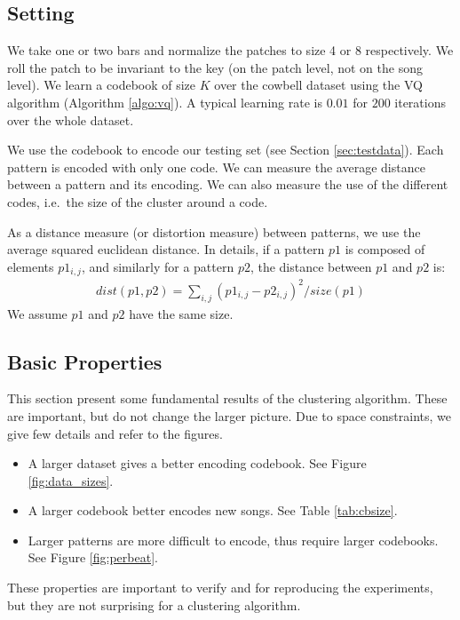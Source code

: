 \documentclass{article}
\newcommand{\ie}{i.e.~}
\begin{document}
\subsection{Setting}\label{ssec:setting}
We take one or two bars and normalize the patches to size 4 or 8 respectively.
We roll the patch to be invariant to the key (on the patch level, not on
the song level). We learn a codebook of size $K$ over the cowbell dataset 
using the VQ algorithm (Algorithm \ref{algo:vq}). A typical learning rate 
is $0.01$ for $200$ iterations over the whole dataset.

We use the codebook to encode our testing set (see Section \ref{sec:testdata}).
Each pattern is encoded with only one code. We can measure the average
distance between a pattern and its encoding. We can also measure the use
of the different codes, \ie the size of the cluster around a code.

As a distance measure (or distortion measure) between patterns, we use
the average squared euclidean distance. In details, if a pattern $p1$
is composed of elements $p1_{i,j}$, and similarly for a pattern $p2$,
the distance between $p1$ and $p2$ is:
\begin{eqnarray}
  dist(p1,p2) = \sum_{i,j} (p1_{i,j} - p2_{i,j})^2 / size(p1)  \label{eq:dist}
\end{eqnarray}
We assume $p1$ and $p2$ have the same size.


\subsection{Basic Properties}
This section present some fundamental results of the clustering algorithm.
These are important, but do not change the larger picture. Due to space
constraints, we give few details and refer to the figures.
\begin{itemize}
\item A larger dataset gives a better encoding codebook. See Figure
\ref{fig:data_sizes}.
\item A larger codebook better encodes new songs. See 
Table \ref{tab:cbsize}.
\item Larger patterns are more difficult to encode, thus require
larger codebooks. See Figure \ref{fig:perbeat}.
\end{itemize}

These properties are important to verify and for reproducing the experiments, 
but they are not surprising for a clustering algorithm.
\end{document}
